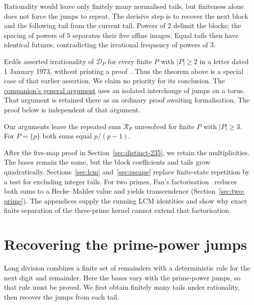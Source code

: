 \documentclass[11pt]{article}
\newcommand{\longrecord}[2]{\href{erdos269-running-lcm-reasoning-surface.pdf\##1}{#2}}
\begin{document}
Rationality would leave only finitely many normalised tails, but finiteness
alone does not force the jumps to repeat. The decisive step is to recover
the next block and the following tail from the current tail. Powers of
$2$ delimit the blocks; the spacing of powers of $5$ separates their five
affine images. Equal tails then have identical futures, contradicting
the irrational frequency of powers of $3$.

Erd\H{o}s asserted irrationality of $\mathcal D_P$ for every finite
$P$ with $|P|\ge2$ in a letter dated 1 January 1973, without printing a
proof~\cite[p.~335]{erdos1974letter}. Thus the theorem above is a special
case of that earlier assertion. We claim no priority for its conclusion.
The \longrecord{r3-distinct-proof}{companion's general argument} uses an
isolated interchange of jumps on a torus. That argument is retained there
as an ordinary proof awaiting formalisation. The proof below is independent
of that argument.

Our arguments leave the repeated sum $\mathcal R_P$ unresolved for finite
$P$ with $|P|\ge3$. For $P=\{p\}$ both sums equal $p/(p-1)$.

After the five-map proof in Section~\ref{sec:distinct-235}, we retain the
multiplicities. The bases remain the same, but the block coefficients and
tails grow quadratically. Sections~\ref{sec:lcm} and~\ref{sec:escape} replace
finite-state repetition by a test for excluding integer tails.
For two primes, Fan's factorisation~\cite{fan2026comment} reduces both sums
to a Hecke--Mahler value and yields transcendence
(Section~\ref{sec:two-prime}). The appendices supply the running LCM
identities and show why exact finite separation of the three-prime kernel
cannot extend that factorisation.

\section{Recovering the prime-power jumps}\label{sec:distinct}\label{sec:distinct-235}
Long division combines a finite set of remainders with a deterministic
rule for the next digit and remainder. Here the bases vary with the
prime-power jumps, so that rule must be proved. We first obtain finitely
many tails under rationality, then recover the jumps from each tail.
\end{document}
